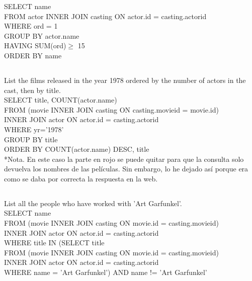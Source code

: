 \documentclass[10pt, oneside]{article}
\begin{document}
SELECT name\\
FROM actor INNER JOIN casting ON actor.id = casting.actorid\\
WHERE ord = 1\\
GROUP BY actor.name\\
HAVING SUM(ord)$\geq$ 15\\
ORDER BY name\\

\subsection{}

List the films released in the year 1978 ordered by the number of actors in the cast, then by title.\\

SELECT title\color{red}, COUNT(actor.name)\color{black}\\
FROM (movie INNER JOIN casting ON casting.movieid = movie.id) \\
INNER JOIN actor ON actor.id = casting.actorid\\
WHERE yr='1978'\\
GROUP BY title\\
ORDER BY COUNT(actor.name) DESC, title\\

\color{blue}*Nota. \color{black} En este caso la parte en rojo se puede quitar para que la consulta solo devuelva los nombres de las películas. Sin embargo, lo he dejado así porque era como se daba por correcta la respuesta en la web.

\subsection{}
List all the people who have worked with 'Art Garfunkel'.\\

SELECT name \\
FROM (movie INNER JOIN casting ON movie.id = casting.movieid) \\
INNER JOIN actor ON actor.id = casting.actorid\\
WHERE title IN \color{blue}(SELECT title\\
FROM (movie INNER JOIN casting ON movie.id = casting.movieid) \\
INNER JOIN actor ON actor.id = casting.actorid\\
WHERE name = 'Art Garfunkel') \color{black}AND name != 'Art Garfunkel'\\
\end{document}
